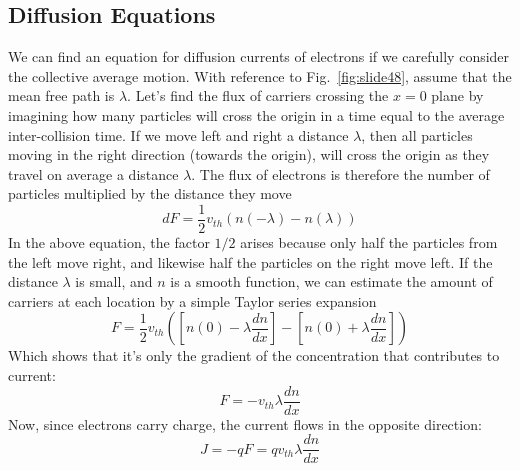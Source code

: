 \subsection{Diffusion Equations}
We can find an equation for diffusion currents of electrons if we carefully consider the collective average motion.  With reference to Fig.~\ref{fig:slide48}, assume that the mean free path is $\lambda$.  Let’s find the flux of carriers crossing the $x=0$ plane by imagining how many particles will cross the origin in a time equal to the average inter-collision time.  If we move left and right a distance $\lambda$, then all particles moving in the right direction (towards the origin), will cross the origin as they travel on average a distance $\lambda$.  The flux of electrons is therefore the number of particles multiplied by the distance they move
    \begin{equation}
        dF = \frac{1}{2}{v_{th}}\left( {n( - \lambda) - n(\lambda)} \right)
    \end{equation}
In the above equation, the factor $1/2$ arises because only half the particles from the left move right, and likewise half the particles on the right move left.  If the distance $\lambda$ is small, and $n$ is a smooth function, we can estimate the amount of carriers at each location by a simple Taylor series expansion
    \begin{equation}
        F = \frac{1}{2}{v_{th}}\left( {\left[ {n(0) - \lambda \frac{{dn}}{{dx}}} \right]
            - \left[ {n(0) + \lambda \frac{{dn}}{{dx}}} \right]} \right)
    \end{equation}
Which shows that it’s only the gradient of the concentration that contributes to current:
    \begin{equation}
        F =  - {v_{th}}\lambda \frac{{dn}}{{dx}}
    \end{equation}
Now, since electrons carry charge, the current flows in the opposite direction:
    \begin{equation}
        J = - qF = q{v_{th}}\lambda \frac{{dn}}{{dx}}
    \end{equation}
